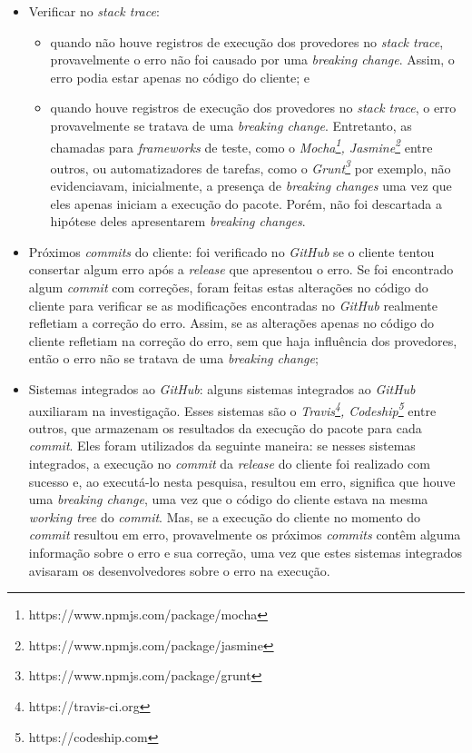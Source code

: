 \begin{itemize}
    \item Verificar no \textit{stack trace}:
    \begin{itemize}
        \item quando não houve registros de execução dos provedores no \textit{stack trace}, provavelmente o erro não foi causado por uma \textit{breaking change}. Assim, o erro podia estar apenas no código do cliente; e

        \item quando houve registros de execução dos provedores no \textit{stack trace}, o erro provavelmente se tratava de uma \textit{breaking change}. Entretanto, as chamadas para \textit{frameworks} de teste, como o \textit{Mocha\footnote{https://www.npmjs.com/package/mocha}, Jasmine\footnote{https://www.npmjs.com/package/jasmine}} entre outros, ou automatizadores de tarefas, como o \textit{Grunt\footnote{https://www.npmjs.com/package/grunt}} por exemplo, não evidenciavam, inicialmente, a presença de \textit{breaking changes} uma vez que eles apenas iniciam a execução do pacote. Porém, não foi descartada a hipótese deles apresentarem \textit{breaking changes}.
    \end{itemize}{}

    \item  Próximos \textit{commits} do cliente: foi verificado no \textit{GitHub} se o cliente tentou consertar algum erro após a \textit{release} que apresentou o erro. Se foi encontrado algum \textit{commit} com correções, foram feitas estas alterações no código do cliente para verificar se as modificações encontradas no \textit{GitHub} realmente refletiam a correção do erro. Assim, se as alterações apenas no código do cliente refletiam na correção do erro, sem que haja influência dos provedores, então o erro não se tratava de uma \textit{breaking change};

    \item Sistemas integrados ao \textit{GitHub}: alguns sistemas integrados ao \textit{GitHub} auxiliaram na investigação. Esses sistemas são o \textit{Travis\footnote{https://travis-ci.org}, Codeship\footnote{https://codeship.com}} entre outros, que armazenam os resultados da execução do pacote para cada \textit{commit}. Eles foram utilizados da seguinte maneira: se nesses sistemas integrados, a execução no \textit{commit} da \textit{release} do cliente foi realizado com sucesso e, ao executá-lo nesta pesquisa, resultou em erro, significa que houve uma \textit{breaking change}, uma vez que o código do cliente estava na mesma \textit{working tree} do \textit{commit}. Mas, se a execução do cliente no momento do \textit{commit} resultou em erro, provavelmente os próximos \textit{commits} contêm alguma informação sobre o erro e sua correção, uma vez que estes sistemas integrados avisaram os desenvolvedores sobre o erro na execução.
\end{itemize}{}

